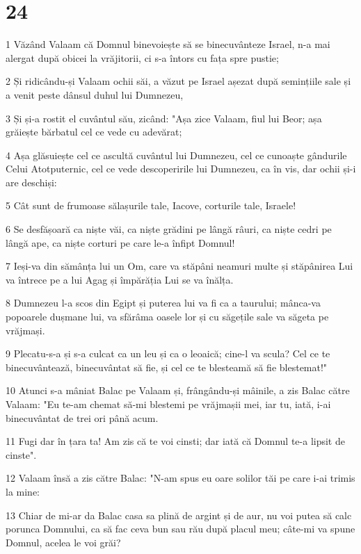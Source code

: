 \chapter{24}

\par 1 Văzând Valaam că Domnul binevoiește să se binecuvânteze Israel, n-a mai alergat după obicei la vrăjitorii, ci s-a întors cu fața spre pustie;
\par 2 Și ridicându-și Valaam ochii săi, a văzut pe Israel așezat după semințiile sale și a venit peste dânsul duhul lui Dumnezeu,
\par 3 Și și-a rostit el cuvântul său, zicând: "Așa zice Valaam, fiul lui Beor; așa grăiește bărbatul cel ce vede cu adevărat;
\par 4 Așa glăsuiește cel ce ascultă cuvântul lui Dumnezeu, cel ce cunoaște gândurile Celui Atotputernic, cel ce vede descoperirile lui Dumnezeu, ca în vis, dar ochii și-i are deschiși:
\par 5 Cât sunt de frumoase sălașurile tale, Iacove, corturile tale, Israele!
\par 6 Se desfășoară ca niște văi, ca niște grădini pe lângă râuri, ca niște cedri pe lângă ape, ca niște corturi pe care le-a înfipt Domnul!
\par 7 Ieși-va din sămânța lui un Om, care va stăpâni neamuri multe și stăpânirea Lui va întrece pe a lui Agag și împărăția Lui se va înălța.
\par 8 Dumnezeu l-a scos din Egipt și puterea lui va fi ca a taurului; mânca-va popoarele dușmane lui, va sfărâma oasele lor și cu săgețile sale va săgeta pe vrăjmași.
\par 9 Plecatu-s-a și s-a culcat ca un leu și ca o leoaică; cine-l va scula? Cel ce te binecuvântează, binecuvântat să fie, și cel ce te blesteamă să fie blestemat!"
\par 10 Atunci s-a mâniat Balac pe Valaam și, frângându-și mâinile, a zis Balac către Valaam: "Eu te-am chemat să-mi blestemi pe vrăjmașii mei, iar tu, iată, i-ai binecuvântat de trei ori până acum.
\par 11 Fugi dar în țara ta! Am zis că te voi cinsti; dar iată că Domnul te-a lipsit de cinste".
\par 12 Valaam însă a zis către Balac: "N-am spus eu oare solilor tăi pe care i-ai trimis la mine:
\par 13 Chiar de mi-ar da Balac casa sa plină de argint și de aur, nu voi putea să calc porunca Domnului, ca să fac ceva bun sau rău după placul meu; câte-mi va spune Domnul, acelea le voi grăi?
